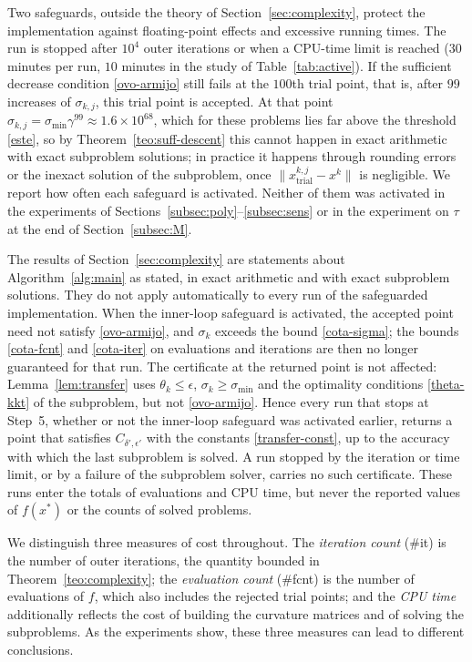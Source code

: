 \documentclass[11pt]{article}
\newcounter{alg}[section]
\begin{document}
Two safeguards, outside the theory of Section~\ref{sec:complexity}, protect the
implementation against floating-point effects and excessive running times. The
run is stopped after $10^4$ outer iterations or when a CPU-time limit is
reached ($30$ minutes per run, $10$ minutes in the study of
Table~\ref{tab:active}). If the sufficient decrease condition
\eqref{ovo-armijo} still fails at the $100$th trial point, that is, after $99$
increases of $\sigma_{k,j}$, this trial point is accepted. At that point
$\sigma_{k,j} = \sigma_{\min}\gamma^{99} \approx 1.6 \times 10^{68}$, which for
these problems lies far above the threshold \eqref{este}, so by
Theorem~\ref{teo:suff-descent} this cannot happen in exact arithmetic with
exact subproblem solutions; in practice it happens
through rounding errors or the inexact solution of the subproblem, once
$\|x^{k,j}_{\mathrm{trial}} - x^k\|$ is negligible. We report how often each
safeguard is activated. Neither of them was activated in the experiments of
Sections~\ref{subsec:poly}--\ref{subsec:sens} or in the experiment on $\tau$
at the end of Section~\ref{subsec:M}.

The results of Section~\ref{sec:complexity} are statements about
Algorithm~\ref{alg:main} as stated, in exact arithmetic and with exact
subproblem solutions. They do not apply automatically to every run of the
safeguarded implementation. When the inner-loop safeguard is activated, the
accepted point need not satisfy \eqref{ovo-armijo}, and $\sigma_k$ exceeds the
bound \eqref{cota-sigma}; the bounds \eqref{cota-fcnt} and \eqref{cota-iter}
on evaluations and iterations are then no longer guaranteed for that run. The
certificate at the returned point is not affected: Lemma~\ref{lem:transfer}
uses $\theta_k \leq \epsilon$, $\sigma_k \geq \sigma_{\min}$ and the
optimality conditions \eqref{theta-kkt} of the subproblem, but not
\eqref{ovo-armijo}. Hence every run that stops at Step~5, whether or not the
inner-loop safeguard was activated earlier, returns a point that satisfies
$C_{\delta',\epsilon'}$ with the constants \eqref{transfer-const}, up to the
accuracy with which the last subproblem is solved. A run stopped by the
iteration or time limit, or by a failure of the subproblem solver, carries no
such certificate. These runs enter the totals of evaluations and CPU time, but
never the reported values of $f(x^*)$ or the counts of solved problems.

We distinguish three measures of cost throughout. The \emph{iteration count}
(\#it) is the number of outer iterations, the quantity bounded in
Theorem~\ref{teo:complexity}; the \emph{evaluation count} (\#fcnt) is the
number of evaluations of $f$, which also includes the rejected trial points;
and the \emph{CPU time} additionally reflects the cost of building the
curvature matrices and of solving the subproblems. As the experiments show,
these three measures can lead to different conclusions.
\end{document}
